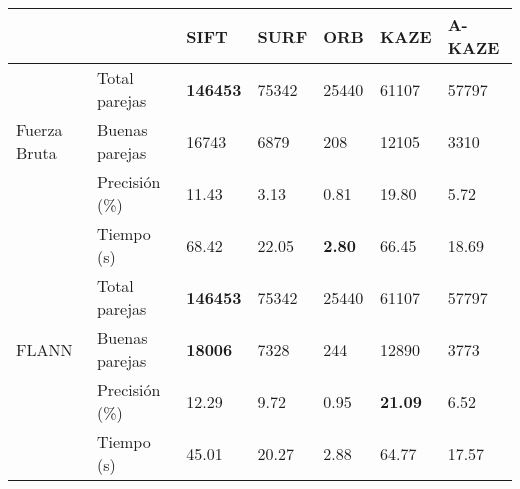 \begin{table}[h]
	\centering
	\label{0752-2}
	\renewcommand{\arraystretch}{0.8}%
	\begin{tabular}{@{}lllllll@{}}
		\toprule
		&                      				& SIFT 			& SURF & ORB 		& KAZE 				& A-KAZE  \\ \midrule 
		\hfill\vline& Total parejas  &\textbf{146453}		& 75342&25440		&61107 				& 57797   \\
		Fuerza Bruta \vline& Buenas parejas & 16743			& 6879 & 208 		& 12105 			& 3310    \\
		\hfill\vline& Precisión (\%) & 11.43				&3.13  &0.81		& 19.80 			& 5.72  \\
		\vspace{0.3cm}
		\hfill\vline& Tiempo (s)     & 68.42				&22.05 & \textbf{2.80} &66.45       & 18.69   \\
		
		\hfill\vline& Total parejas  &\textbf{146453}& 75342&25440			&61107 				& 57797   \\
		FLANN  \hfill\vline& Buenas parejas &\textbf{18006} & 7328 & 244 			& 12890 			& 3773    \\
		\hfill\vline& Precisión (\%) & 12.29				& 9.72 &0.95  			& \textbf{21.09} 	& 6.52    \\ 
		\hfill\vline& Tiempo (s)     & 45.01				& 20.27& 2.88			& 64.77				& 17.57   \\ 
		\bottomrule
	\end{tabular}
\end{table}


